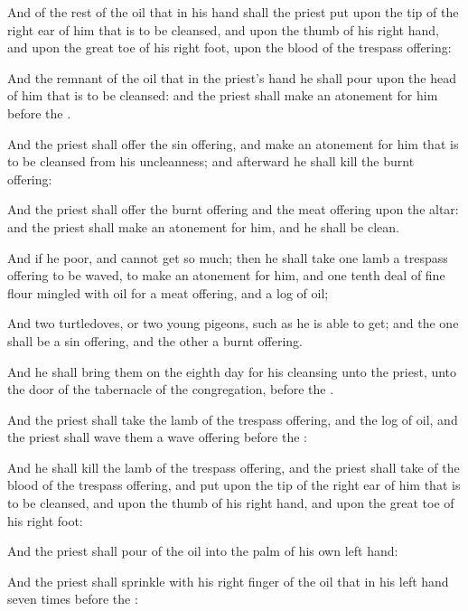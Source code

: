 {And of the
rest of the
oil that
{} in his
hand shall the
priest
put upon the
tip of the
right
ear of him that is to be
cleansed, and upon the
thumb of his
right
hand, and upon the great
toe of his
right
foot, upon the
blood of the trespass
offering:

And the
remnant of the
oil that
{} in the
priest’s
hand he shall
pour upon the
head of him that is to be
cleansed: and the
priest shall make an
atonement for him
before the
{}.

And the
priest shall
offer the sin
offering, and make an
atonement for him that is to be
cleansed from his
uncleanness; and
afterward he shall
kill the burnt
offering:

And the
priest shall
offer the burnt
offering and the meat
offering upon the
altar: and the
priest shall make an
atonement for him, and he shall be
clean.


\par }{\PP {}And if he
{}
poor, and cannot
get so much; then he shall
take
one
lamb
{} a trespass
offering to be
waved, to make an
atonement for him, and
one tenth
deal of fine
flour
mingled with
oil for a meat
offering, and a
log of
oil;

And
two
turtledoves, or
two
young
pigeons, such as he is able to
get; and the
one shall be a sin
offering, and the
other a burnt
offering.

And he shall
bring them on the
eighth
day for his
cleansing unto the
priest, unto the
door of the
tabernacle of the
congregation,
before the
{}.

And the
priest shall
take the
lamb of the trespass
offering, and the
log of
oil, and the
priest shall
wave them
{} a wave
offering
before the
{}:

And he shall
kill the
lamb of the trespass
offering, and the
priest shall
take
{} of the
blood of the trespass
offering, and
put
{} upon the
tip of the
right
ear of him that is to be
cleansed, and upon the
thumb of his
right
hand, and upon the great
toe of his
right
foot:

And the
priest shall
pour of the
oil into the
palm of his
own left
hand:

And the
priest shall
sprinkle with his
right
finger
{} of the
oil that
{} in his
left
hand
seven
times
before the
{}:

}
